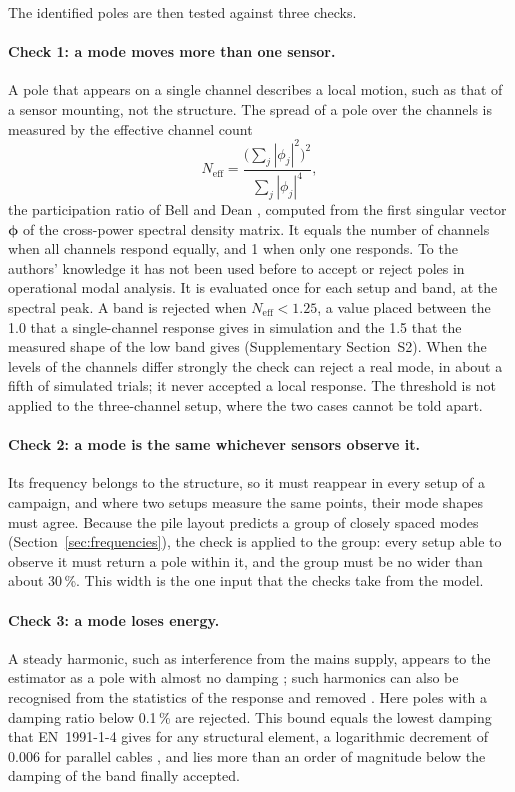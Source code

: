 \documentclass[11pt]{article}
\begin{document}
The identified poles are then tested against three checks.

\paragraph{Check 1: a mode moves more than one sensor.} A pole that appears on a single channel describes a local motion, such as that of a sensor mounting, not the structure. The spread of a pole over the channels is measured by the effective channel count
%
\begin{equation}
N_{\mathrm{eff}} = \frac{\bigl(\sum_j|\phi_j|^2\bigr)^2}{\sum_j|\phi_j|^4} ,
\label{eq:neff}
\end{equation}
%
the participation ratio of Bell and Dean \cite{bell1970,hodges1982}, computed from the first singular vector $\boldsymbol{\phi}$ of the cross-power spectral density matrix. It equals the number of channels when all channels respond equally, and 1 when only one responds. To the authors' knowledge it has not been used before to accept or reject poles in operational modal analysis. It is evaluated once for each setup and band, at the spectral peak. A band is rejected when $N_{\mathrm{eff}} < 1.25$, a value placed between the 1.0 that a single-channel response gives in simulation and the 1.5 that the measured shape of the low band gives (Supplementary Section~S2). When the levels of the channels differ strongly the check can reject a real mode, in about a fifth of simulated trials; it never accepted a local response. The threshold is not applied to the three-channel setup, where the two cases cannot be told apart.

\paragraph{Check 2: a mode is the same whichever sensors observe it.} Its frequency belongs to the structure, so it must reappear in every setup of a campaign, and where two setups measure the same points, their mode shapes must agree. Because the pile layout predicts a group of closely spaced modes (Section~\ref{sec:frequencies}), the check is applied to the group: every setup able to observe it must return a pole within it, and the group must be no wider than about 30\,\%. This width is the one input that the checks take from the model.

\paragraph{Check 3: a mode loses energy.} A steady harmonic, such as interference from the mains supply, appears to the estimator as a pole with almost no damping \cite{mohanty2004,jacobsen2005}; such harmonics can also be recognised from the statistics of the response \cite{brincker2000,jacobsen2007} and removed \cite{motte2015,gres2021}. Here poles with a damping ratio below 0.1\,\% are rejected. This bound equals the lowest damping that EN~1991-1-4 gives for any structural element, a logarithmic decrement of 0.006 for parallel cables \cite{en1991}, and lies more than an order of magnitude below the damping of the band finally accepted.
\end{document}
